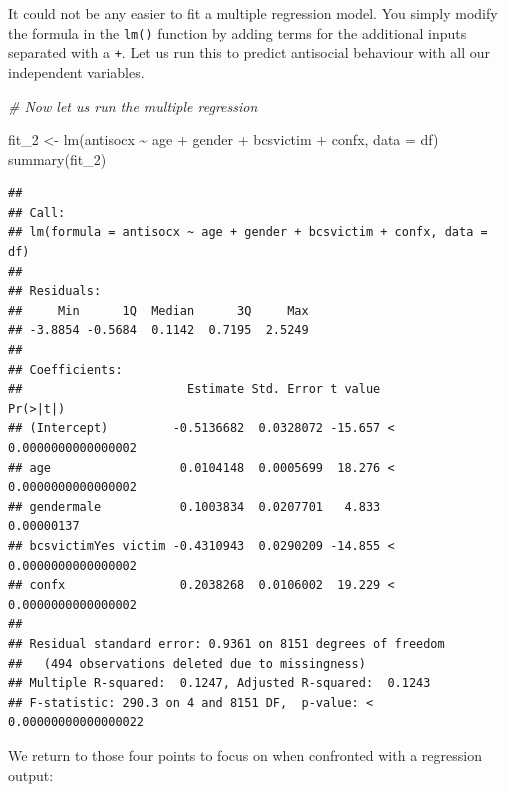 \documentclass[
]{book}
\newenvironment{Shaded}{\begin{snugshade}}{\end{snugshade}}
\newcommand{\AttributeTok}[1]{\textcolor[rgb]{0.77,0.63,0.00}{#1}}
\newcommand{\CommentTok}[1]{\textcolor[rgb]{0.56,0.35,0.01}{\textit{#1}}}
\newcommand{\FunctionTok}[1]{\textcolor[rgb]{0.00,0.00,0.00}{#1}}
\newcommand{\NormalTok}[1]{#1}
\newcommand{\OtherTok}[1]{\textcolor[rgb]{0.56,0.35,0.01}{#1}}
\newcommand{\SpecialCharTok}[1]{\textcolor[rgb]{0.00,0.00,0.00}{#1}}
\begin{document}
It could not be any easier to fit a multiple regression model. You simply modify the formula in the \texttt{lm()} function by adding terms for the additional inputs separated with a \texttt{+}. Let us run this to predict antisocial behaviour with all our independent variables.

\begin{Shaded}
\begin{Highlighting}[]
\CommentTok{\# Now let us run the multiple regression}

\NormalTok{fit\_2 }\OtherTok{\textless{}{-}} \FunctionTok{lm}\NormalTok{(antisocx }\SpecialCharTok{\textasciitilde{}}\NormalTok{ age }\SpecialCharTok{+}\NormalTok{ gender }\SpecialCharTok{+}\NormalTok{ bcsvictim }\SpecialCharTok{+}\NormalTok{ confx, }\AttributeTok{data =}\NormalTok{ df)}
\FunctionTok{summary}\NormalTok{(fit\_2)}
\end{Highlighting}
\end{Shaded}

\begin{verbatim}
## 
## Call:
## lm(formula = antisocx ~ age + gender + bcsvictim + confx, data = df)
## 
## Residuals:
##     Min      1Q  Median      3Q     Max 
## -3.8854 -0.5684  0.1142  0.7195  2.5249 
## 
## Coefficients:
##                       Estimate Std. Error t value             Pr(>|t|)
## (Intercept)         -0.5136682  0.0328072 -15.657 < 0.0000000000000002
## age                  0.0104148  0.0005699  18.276 < 0.0000000000000002
## gendermale           0.1003834  0.0207701   4.833           0.00000137
## bcsvictimYes victim -0.4310943  0.0290209 -14.855 < 0.0000000000000002
## confx                0.2038268  0.0106002  19.229 < 0.0000000000000002
## 
## Residual standard error: 0.9361 on 8151 degrees of freedom
##   (494 observations deleted due to missingness)
## Multiple R-squared:  0.1247, Adjusted R-squared:  0.1243 
## F-statistic: 290.3 on 4 and 8151 DF,  p-value: < 0.00000000000000022
\end{verbatim}

We return to those four points to focus on when confronted with a regression output:
\end{document}
